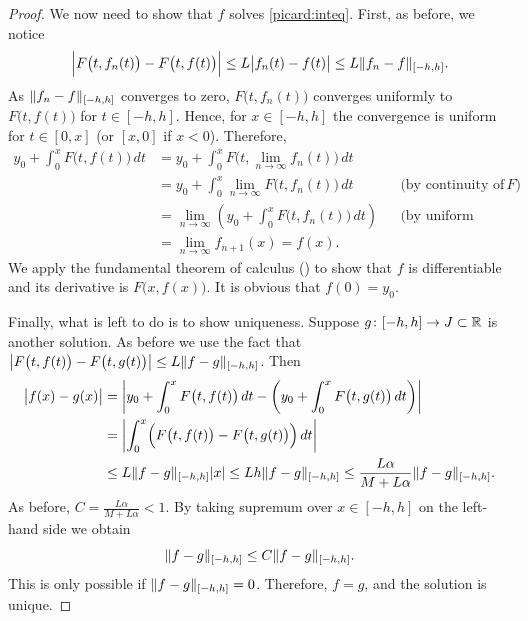 \begin{proof}
We now need to show that $f$ solves \eqref{picard:inteq}.
First, as before, we notice
\begin{equation*}
\Bigl\lvert {F\bigl(t,f_{n}(t)\bigr) - 
F\bigl(t,f(t)\bigr)} \Bigr\rvert
\leq
L \bigl\lvert {f_n(t)-f(t)} \bigr\rvert
\leq
L \lVert {f_n-f} \rVert_{[-h,h]} .
\end{equation*}
As $\lVert {f_n-f} \rVert_{[-h,h]}$ converges to zero,
$F\bigl(t,f_n(t)\bigr)$ converges uniformly to $F\bigl(t,f(t)\bigr)$
for $t \in [-h,h]$.  Hence, for $x \in [-h,h]$
the convergence is uniform %
for $t \in [0,x]$ (or $[x,0]$ if $x < 0$).  Therefore,
\begin{align*}
y_0
+
\int_0^{x}
F(t,f(t)\bigr)\,dt
& =
y_0
+
\int_0^{x}
F\bigl(t,\lim_{n\to\infty} f_n(t)\bigr)\,dt
& &
\\
& =
y_0
+
\int_0^{x}
\lim_{n\to\infty} F\bigl(t,f_n(t)\bigr)\,dt
& & \text{(by continuity of } F\text{)}
\\
& =
\lim_{n\to\infty} 
\left(
y_0
+
\int_0^{x}
F\bigl(t,f_n(t)\bigr)\,dt
\right)
& & \text{(by uniform convergence)}
\\
& =
\lim_{n\to\infty} 
f_{n+1}(x)
=
f(x) .
& &
\end{align*}
We apply the fundamental theorem of calculus () to show that
$f$ is differentiable and its derivative is $F\bigl(x,f(x)\bigr)$.  It is obvious
that $f(0) = y_0$.

Finally, what is left to do is to show uniqueness.  Suppose $g \colon [-h,h]
\to J \subset {\mathbb{R}}$ is another solution.
As before we use the fact that
$\bigl\lvert {F\bigl(t,f(t)\bigr) - F\bigl(t,g(t)\bigr)} \bigr\rvert \leq L \lVert {f-g} \rVert_{[-h,h]}$.
Then
\begin{equation*}
\begin{split}
\bigl\lvert {f(x)-g(x)} \bigr\rvert
& =
\left\lvert {
y_0
+
\int_0^{x}
F\bigl(t,f(t)\bigr)\,dt
-
\left(
y_0
+
\int_0^{x}
F\bigl(t,g(t)\bigr)\,dt
\right)
} \right\rvert
\\
& =
\left\lvert {
\int_0^{x}
\Bigl(
F\bigl(t,f(t)\bigr)
-
F\bigl(t,g(t)\bigr)
\Bigr)
\,dt
} \right\rvert
\\
& \leq
L\lVert {f-g} \rVert_{[-h,h]}\lvert {x} \rvert
\leq
Lh\lVert {f-g} \rVert_{[-h,h]}
\leq
\frac{L\alpha}{M+L\alpha}\lVert {f-g} \rVert_{[-h,h]} .
\end{split}
\end{equation*}
As 
before, $C = \frac{L\alpha}{M+L\alpha} < 1$.  By taking supremum over $x \in
[-h,h]$ on the
left-hand side we obtain
\begin{equation*}
\lVert {f-g} \rVert_{[-h,h]} \leq C \lVert {f-g} \rVert_{[-h,h]} .
\end{equation*}
This is only possible if $\lVert {f-g} \rVert_{[-h,h]} = 0$.  Therefore, $f=g$, and the
solution is unique.
\end{proof}

